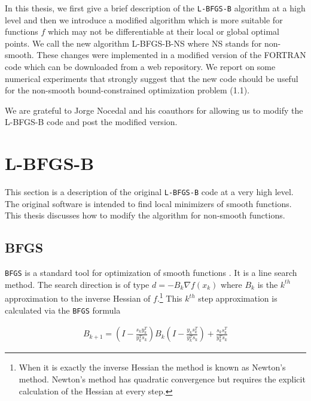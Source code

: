 In this thesis, we first give a brief description of the \texttt{L-BFGS-B} algorithm
at a high level and then we introduce a modified algorithm which
is more suitable for functions $f$ which may not be
differentiable at their local or global optimal points.  
We call the new algorithm L-BFGS-B-NS where NS stands for
non-smooth.  These changes were implemented in a modified version 
of the FORTRAN code \citep{lbfgsbNS} which can be downloaded from a web repository.  We report on some numerical experiments 
that strongly suggest that the new code should be useful for the
non-smooth bound-constrained optimization problem (1.1).

We are grateful to Jorge Nocedal and his coauthors for allowing us 
to modify the L-BFGS-B code and post the modified version.  

\chapter{L-BFGS-B}
\label{ChapterConstraints} %

This section is a description of the original \texttt{L-BFGS-B} code \citep{lbfgsbsoftware, codepaper} at a very high level. The original software is intended to find local minimizers of smooth functions. This thesis discusses how to modify the algorithm for non-smooth functions.

\section{BFGS}

\texttt{BFGS} is a standard tool for optimization of smooth functions \citep{nocedal}. It is a line search method. The search direction is of type $d = -B_k \nabla f(x_k)$ where $B_k$ is the $k^{th}$ approximation to the inverse Hessian of $f$.\footnote{When it is exactly the inverse Hessian the method is known as Newton's method. Newton's method has quadratic convergence but requires the explicit calculation of the Hessian at every step.} This $k^{th}$ step approximation is calculated via the \texttt{BFGS} formula

\begin{equation} \label{bfgsupdate}
  \begin{aligned}
    B_{k+1} = \left(I - \frac{s_ky_k^T}{y_k^Ts_k} \right) B_k \left( I - \frac{y_ks_k^T}{y_k^Ts_k} \right) + \frac{s_k s_k^T}{y_k^T s_k}
  \end{aligned}
\end{equation}

